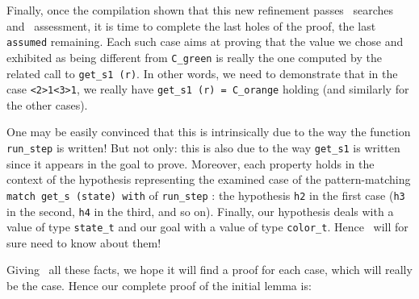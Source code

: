 Finally, once the compilation shown that this new refinement passes
\zenon\ searches and \coq\ assessment, it is time to complete the last
holes of the proof, the last \lstinline"assumed" remaining. Each such
case aims at proving that the value we chose and exhibited as being
different from \lstinline"C_green" is really the one computed by the
related call to \lstinline"get_s1 (r)". In other words, we need to
demonstrate that in the case \lstinline"<2>1<3>1", we really have
\lstinline"get_s1 (r) = C_orange" holding (and similarly for the other
cases).

One may be easily convinced that this is intrinsically due to
the way the function \lstinline"run_step" is written! But not only:
this is also due to the way \lstinline"get_s1" is written since it
appears in the goal to prove.
Moreover, each property holds in the context of the hypothesis
representing the examined case of the pattern-matching
\lstinline"match get_s (state) with" of \lstinline"run_step" : the
hypothesis \lstinline"h2" in the first case (\lstinline"h3" in the
second, \lstinline"h4" in the third, and so on). Finally, our
hypothesis deals with a value of type \lstinline"state_t" and our goal
with a value of type \lstinline"color_t". Hence \zenon\ will for sure
need to know about them!

Giving \zenon\ all these facts, we hope it will find a proof for each
case, which will really be the case. Hence our complete proof of the
initial lemma is:

